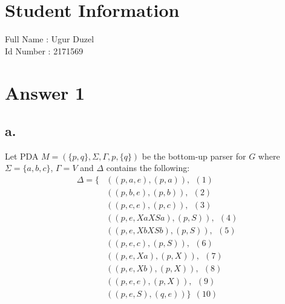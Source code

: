 \documentclass[12pt]{article}
\begin{document}
\section*{Student Information } 
Full Name :  Ugur Duzel\\
Id Number :  2171569\\

\section*{Answer 1}

\subsection*{a.}
Let PDA $M=(\{p,q\},\Sigma,\Gamma,p,\{q\})$ be the bottom-up parser for $G$ where $\Sigma=\{a,b,c\}$, $\Gamma=V$ and $\Delta$ contains the following: \\

\begin{equation}
\begin{split}
\Delta = \{ & ((p,a,e),(p,a)),\ \ (1)\\
		& ((p,b,e),(p,b)),\ \ (2) \\
		& ((p,c,e),(p,c)),\ \ (3) \\
		& ((p,e,XaXSa),(p,S)),\ \ (4) \\
		& ((p,e,XbXSb),(p,S)),\ \ (5) \\
		& ((p,e,c),(p,S)),\ \ (6) \\
		& ((p,e,Xa),(p,X)),\ \ (7) \\
		& ((p,e,Xb),(p,X)),\ \ (8) \\
		& ((p,e,e),(p,X)),\ \ (9) \\
		& ((p,e,S),(q,e)) \}\ \ (10)
\end{split}
\end{equation}
\end{document}
